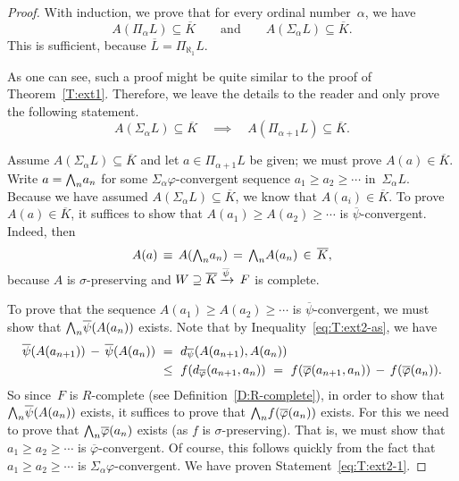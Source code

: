 \begin{proof}
With induction,
we prove that for every ordinal number~$\alpha$,
we have 
\begin{equation*}
A(\Pi_\alpha L)\subseteq \overline K
\qquad\text{and}\qquad
A(\Sigma_\alpha L)\subseteq \overline K.
\end{equation*}
This is sufficient, because $\overline L = \Pi_{\aleph_1} L$.

As one can  see,
such a proof might be quite similar to the proof of Theorem~\ref{T:ext1}.
Therefore,
we leave the details to the reader
and only prove the following statement.
\begin{equation}
\label{eq:T:ext2-1}
A(\Sigma_\alpha L) \subseteq \overline K
\quad\implies\quad
A(\Pi_{\alpha+1}L)\subseteq\overline K.
\end{equation}

Assume $A(\Sigma_\alpha L)\subseteq \overline{K}$
and let $a\in \Pi_{\alpha+1} L$ be given;
we must prove $A(a)\in \overline K$.
Write $a=\textstyle{\bigwedge}_n a_n$ for some $\Sigma_{\alpha}\varphi$-convergent
sequence
$a_1 \geq a_2 \geq \dotsb$
in~$\Sigma_\alpha L$.
Because we have assumed $A(\Sigma_\alpha L)\subseteq \overline{K}$,
we know that $A(a_i) \in \overline K$.
To prove $A(a)\in\overline K$,
it suffices to show that $A(a_1) \geq A(a_2) \geq \dotsb$
is $\overline{\psi}$-convergent.
Indeed, then
\begin{equation*}
A(a) \,\equiv\, A(\textstyle{\bigwedge}_n a_n) \,=\, \textstyle{\bigwedge}_n A(a_n)\,\in\, \overline{K},
\end{equation*}
because $A$ is $\sigma$-preserving and 
$W \supseteq \overline{K}\,\smash{\xrightarrow{\overline{\psi}}\,F}$
is complete.

To prove that the sequence $A(a_1)\geq A(a_2) \geq \dotsb$
is $\overline{\psi}$-convergent,
we must show that $\textstyle{\bigwedge}_n \overline \psi(A(a_n))$ exists.
Note that by Inequality~\eqref{eq:T:ext2-as},
we have
\begin{alignat*}{3}
\overline{\psi}(A(a_{n+1}))
\,-\, \overline{\psi}(A(a_n))
\ &=\ 
\ld{\overline\psi}(A(a_{n+1}),A(a_n))\\
\ &\leq\ 
f(\ld{\overline\varphi}(a_{n+1},a_n))
\ =\ 
f(\overline\varphi(a_{n+1},a_n)) 
\,-\, f(\overline\varphi(a_n)).
\end{alignat*}
So since~$F$ is $R$-complete (see Definition~\ref{D:R-complete}),
in order to show that $\textstyle{\bigwedge}_n\overline{\psi}(A(a_n))$
exists,
it suffices to prove that $\textstyle{\bigwedge}_n f(\overline{\varphi}(a_n))$
exists. 
For this
we need to prove that $\textstyle{\bigwedge}_n\overline\varphi(a_n)$ exists
(as  $f$ is $\sigma$-preserving).
That is,
we must show that $a_1 \geq a_2 \geq \dotsb$ is 
$\overline{\varphi}$-convergent.
Of course,
this follows quickly from the fact that $a_1 \geq a_2 \geq \dotsb$
is $\Sigma_{\alpha}\varphi$-convergent.
We have proven Statement~\eqref{eq:T:ext2-1}.
\end{proof}
